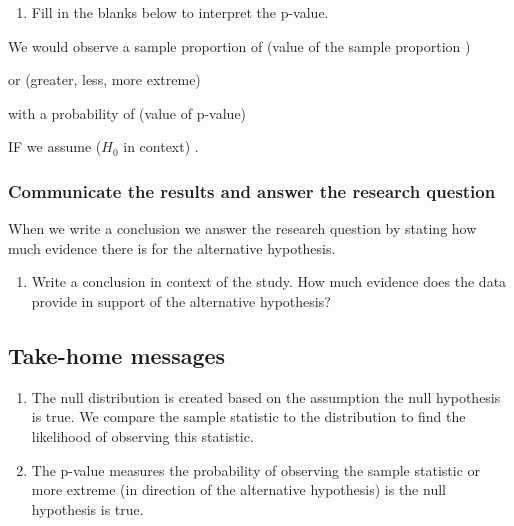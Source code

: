 \documentclass[
]{report}
\providecommand{\tightlist}{%
  \setlength{\itemsep}{0pt}\setlength{\parskip}{0pt}}
\begin{document}
\newpage

\begin{enumerate}
\def\labelenumi{\arabic{enumi}.}
\setcounter{enumi}{12}
\tightlist
\item
  Fill in the blanks below to interpret the p-value.
\end{enumerate}


We would observe a sample proportion of (value of the sample proportion )\hrulefill  

or (greater, less, more extreme) \hrulefill   

with a probability of (value of p-value) \hrulefill  

IF we assume (\(H_0\) in context) \hrulefill.

\vspace{12pt}

\hypertarget{communicate-the-results-and-answer-the-research-question}{%
\subsubsection*{Communicate the results and answer the research question}\label{communicate-the-results-and-answer-the-research-question}}

When we write a conclusion we answer the research question by stating how much evidence there is for the alternative hypothesis.

\begin{enumerate}
\def\labelenumi{\arabic{enumi}.}
\setcounter{enumi}{13}
\tightlist
\item
  Write a conclusion in context of the study. How much evidence does the data provide in support of the alternative hypothesis?
\end{enumerate}

\vspace{1in}

\hypertarget{take-home-messages-1}{%
\subsection{Take-home messages}\label{take-home-messages-1}}

\begin{enumerate}
\def\labelenumi{\arabic{enumi}.}
\item
  The null distribution is created based on the assumption the null hypothesis is true. We compare the sample statistic to the distribution to find the likelihood of observing this statistic.
\item
  The p-value measures the probability of observing the sample statistic or more extreme (in direction of the alternative hypothesis) is the null hypothesis is true.
\end{enumerate}
\end{document}
